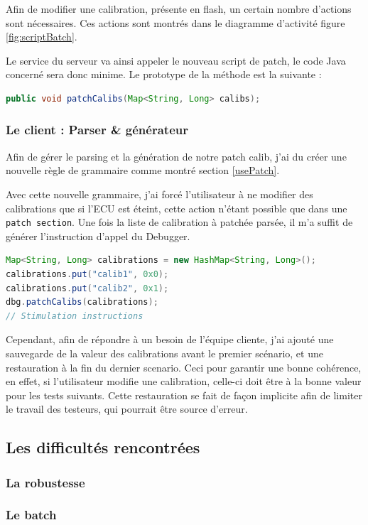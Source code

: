 	Afin de modifier une calibration, présente en flash, un certain nombre d'actions sont nécessaires. Ces actions sont montrés dans le diagramme d'activité figure \ref{fig:scriptBatch}.
	
	Le service du serveur va ainsi appeler le nouveau script de patch, le code Java concerné sera donc minime. Le prototype de la méthode est la suivante : 
	\begin{lstlisting}[language=Java, numbers=none]
public void patchCalibs(Map<String, Long> calibs);
	\end{lstlisting}
\newpage
	\subsubsection{Le client : Parser \& générateur}
	Afin de gérer le parsing et la génération de notre patch calib, j'ai du créer une nouvelle règle de grammaire comme montré section \ref{usePatch}. 
	
	Avec cette nouvelle grammaire, j'ai forcé l'utilisateur à ne modifier des calibrations que si l'ECU est éteint, cette action n'étant possible que dans une \texttt{patch section}. Une fois la liste de calibration à patchée parsée, il m'a suffit de générer l'instruction d'appel du Debugger.
	
	\begin{lstlisting}[language=Java]
Map<String, Long> calibrations = new HashMap<String, Long>();
calibrations.put("calib1", 0x0);
calibrations.put("calib2", 0x1);
dbg.patchCalibs(calibrations);
// Stimulation instructions
	\end{lstlisting}
	
	Cependant, afin de répondre à un besoin de l'équipe cliente, j'ai ajouté une sauvegarde de la valeur des calibrations avant le premier scénario, et une restauration à la fin du dernier scenario. Ceci pour garantir une bonne cohérence, en effet, si l'utilisateur modifie une calibration, celle-ci doit être à la bonne valeur pour les tests suivants. Cette restauration se fait de façon implicite afin de limiter le travail des testeurs, qui pourrait être source d'erreur.
	
	\subsection{Les difficultés rencontrées}
	\subsubsection{La robustesse}
	\subsubsection{Le batch}

